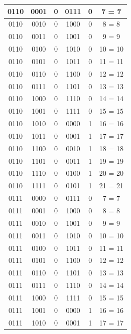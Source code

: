 \documentclass{exam}
\begin{document}
\begin{center}
\begin{longtable}{|c|c|c|c|c|c|}
                0110 & 0001 & 0 & 0111 & 0 & 7 = 7 \\ \hline
                0110 & 0010 & 0 & 1000 & 0 & 8 = 8 \\ \hline
                0110 & 0011 & 0 & 1001 & 0 & 9 = 9 \\ \hline
                0110 & 0100 & 0 & 1010 & 0 & 10 = 10 \\ \hline
                0110 & 0101 & 0 & 1011 & 0 & 11 = 11 \\ \hline
                0110 & 0110 & 0 & 1100 & 0 & 12 = 12 \\ \hline
                0110 & 0111 & 0 & 1101 & 0 & 13 = 13 \\ \hline
                0110 & 1000 & 0 & 1110 & 0 & 14 = 14 \\ \hline
                0110 & 1001 & 0 & 1111 & 0 & 15 = 15 \\ \hline
                0110 & 1010 & 0 & 0000 & 1 & 16 = 16 \\ \hline
                0110 & 1011 & 0 & 0001 & 1 & 17 = 17 \\ \hline
                0110 & 1100 & 0 & 0010 & 1 & 18 = 18 \\ \hline
                0110 & 1101 & 0 & 0011 & 1 & 19 = 19 \\ \hline
                0110 & 1110 & 0 & 0100 & 1 & 20 = 20 \\ \hline
                0110 & 1111 & 0 & 0101 & 1 & 21 = 21 \\ \hline
                0111 & 0000 & 0 & 0111 & 0 & 7 = 7 \\ \hline
                0111 & 0001 & 0 & 1000 & 0 & 8 = 8 \\ \hline
                0111 & 0010 & 0 & 1001 & 0 & 9 = 9 \\ \hline
                0111 & 0011 & 0 & 1010 & 0 & 10 = 10 \\ \hline
                0111 & 0100 & 0 & 1011 & 0 & 11 = 11 \\ \hline
                0111 & 0101 & 0 & 1100 & 0 & 12 = 12 \\ \hline
                0111 & 0110 & 0 & 1101 & 0 & 13 = 13 \\ \hline
                0111 & 0111 & 0 & 1110 & 0 & 14 = 14 \\ \hline
                0111 & 1000 & 0 & 1111 & 0 & 15 = 15 \\ \hline
                0111 & 1001 & 0 & 0000 & 1 & 16 = 16 \\ \hline
                0111 & 1010 & 0 & 0001 & 1 & 17 = 17 \\ \hline

\end{longtable}
\end{center}
\end{document}
